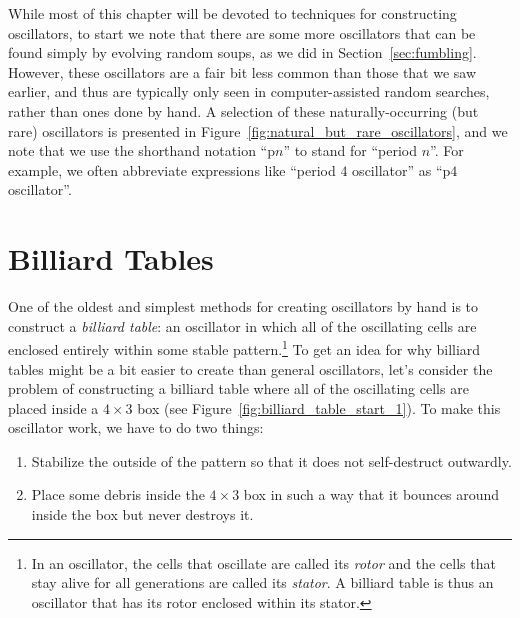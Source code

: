 While most of this chapter will be devoted to techniques for constructing oscillators, to start we note that there are some more oscillators that can be found simply by evolving random soups, as we did in Section~\ref{sec:fumbling}. However, these oscillators are a fair bit less common than those that we saw earlier, and thus are typically only seen in computer-assisted random searches, rather than ones done by hand. A selection of these naturally-occurring (but rare) oscillators is presented in Figure~\ref{fig:natural_but_rare_oscillators}, and we note that we use the shorthand notation ``p$n$'' to stand for ``period $n$''. For example, we often abbreviate expressions like ``period $4$ oscillator'' as ``p$4$ oscillator''.


\section{Billiard Tables}\label{sec:billiard_tables}

One of the oldest and simplest methods for creating oscillators by hand is to construct a \emph{billiard table}: an oscillator in which all of the oscillating cells are enclosed entirely within some stable pattern.\footnote{In an oscillator, the cells that oscillate are called its \emph{rotor} and the cells that stay alive for all generations are called its \emph{stator}. A billiard table is thus an oscillator that has its rotor enclosed within its stator.} To get an idea for why billiard tables might be a bit easier to create than general oscillators, let's consider the problem of constructing a billiard table where all of the oscillating cells are placed inside a $4 \times 3$ box (see Figure~\ref{fig:billiard_table_start_1}). To make this oscillator work, we have to do two things:\medskip

\begin{enumerate}
	\item[1)] Stabilize the outside of the pattern so that it does not self-destruct outwardly.\smallskip
	
	\item[2)] Place some debris inside the $4 \times 3$ box in such a way that it bounces around inside the box but never destroys it.\medskip
\end{enumerate}

